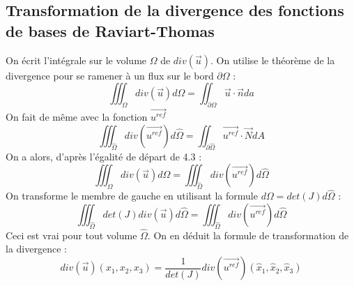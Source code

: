 \documentclass[a4paper,12pt]{article}
\begin{document}
\subsection{Transformation de la divergence des fonctions de bases de Raviart-Thomas}
On écrit l'intégrale sur le volume $\Omega$ de $div(\vec{u})$. On utilise le théorème de la divergence
pour se ramener à un flux sur le bord $\partial \Omega$ :
\[
\iiint_{\Omega} {div(\vec{u}) d\Omega} = \iint_{\partial \Omega}{\vec{u} \cdot \vec{n}da}
\]
On fait de même avec la fonction $\vec{u^{ref}}$
\[
\iiint_{\hat{\Omega}} {div(\vec{u^{ref}}) d\hat{\Omega}} = \iint_{\partial \hat{\Omega}}{\vec{u^{ref}} \cdot \vec{N}dA}
\]
On a alors, d'après l'égalité de départ de 4.3 :
\[
\iiint_{\Omega} {div(\vec{u}) d\Omega} = \iiint_{\hat{\Omega}} {div(\vec{u^{ref}}) d\hat{\Omega}}
\]
On transforme le membre de gauche en utilisant la formule $d\Omega = det(J)d\hat{\Omega}$ :
\[
\iiint_{\hat{\Omega}} det(J) {div(\vec{u}) d\hat{\Omega}} = \iiint_{\hat{\Omega}} {div(\vec{u^{ref}}) d\hat{\Omega}}
\]
Ceci est vrai pour tout volume $\hat{\Omega}$. On en déduit la formule de transformation de la divergence :
$$\boxed{div(\vec{u}) (x_{1},x_{2},x_{3})= \frac{1}{det(J)}div(\vec{u^{ref}})(\hat{x}_{1},\hat{x}_{2},\hat{x}_{3})}$$
\newpage


\end{document}
